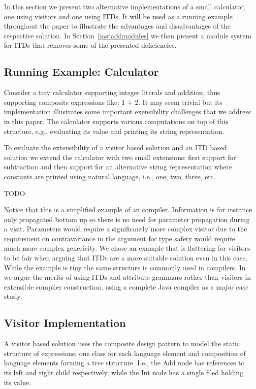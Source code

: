In this section we present two alternative implementations of a small
calculator, one using visitors and one using ITDs. It will be used as a
running example throughout the paper to illustrate the advantages and
disadvantages of the respective solution. In Section~\ref{jastaddmodules}
we then present a module system for ITDs that removes some of the presented
deficiencies.

\subsection{Running Example: Calculator}
Consider a tiny calculator supporting integer literals and addition, thus 
supporting composite expressions like: 1 + 2. It may seem trivial but its 
implementation illustrates some important exensibility challenges that we 
address in this paper. The calculator supports various computations on top 
of this structure, e.g., evaluating its value and printing its string
representation.

To evaluate the extensibility of a visitor based solution and an ITD based
solution we extend the calculator with two small extensions: first support
for subtraction and then support for an alternative string representation 
where constants are printed using natural language, i.e., one, two, 
three, etc.

TODO: %

Notice that this is a simplified example of an compiler. Information is
for instance only propagated bottom up so there is no need for parameter
propagation during a visit. Parameters would require a significantly more 
complex visitor due to the requirement on contravariance in the argument 
for type safety would require much more complex genericity. We chose an 
example that is flattering for visitors to be fair when arguing that ITDs 
are a more suitable solution even in this case. While the example is 
tiny the same structure is commonly used in compilers. In~\cite{} we argue 
the merits of using ITDs and attribute grammars rather than visitors in 
extensible compiler construction, using a complete Java compiler as a 
major case study.

\subsection{Visitor Implementation}
A visitor based solution uses the composite design pattern to model the
static structure of expressions: one class for each language element and
composition of language elements forming a tree structure. I.e., the 
Add node has references to its left and right child respectively, while 
the Int node has a single filed holding its value.

